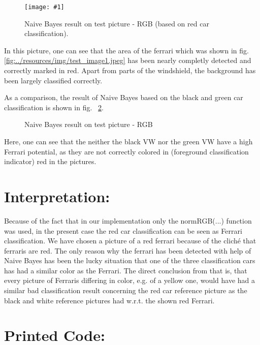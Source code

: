 \documentclass[a4paper,headings=small]{scrartcl}
\numberwithin{equation}{section} %
\numberwithin{figure}{section}   %
\newcommand{\image}[3]{
	\begin{figure}[htbp]
		\centering
		\texttt{[image: \#1]}
		\caption{#3}
		\label{fig:#1}
	\end{figure}
}
\newcommand{\generatedImgRoot}{../resources/img}
\newcommand{\generatedImgRootTwo}{../../../target}
\begin{document}
\image{\generatedImgRootTwo/1rot_result_ml.png}{0.8}{%
		Naive Bayes result on test picture - RGB (based on red car classification).}

In this picture, one can see that the area of the ferrari
which was shown in fig. \ref{fig:\generatedImgRoot/test_image1.jpeg}
has been nearly completly detected and correctly marked in red.
Apart from parts of the windshield, the background has been largely classified correctly.

As a comparison, the result of Naive Bayes based on the black and green car classification
is shown in fig. ~\ref{fig:label4}.

\begin{figure}
 \hfill
{}
\caption{Naive Bayes result on test picture - RGB}
\label{fig:label4}
\end{figure}

Here, one can see that the neither the black VW nor the green VW have a high Ferrari potential,
as they are not correctly colored in (foreground classification indicator) red in the pictures.

\section{Interpretation:}

Because of the fact that in our implementation only the normRGB(...) function was used,
in the present case the red car classification can be seen as Ferrari classification.
We have chosen a picture of a red ferrari because of the cliché that ferraris are red.
The only reason why the ferrari has been detected with help of Naive Bayes
has been the lucky situation that one of the three classification cars has had
a similar color as the Ferrari.
The direct conclusion from that is, that every picture of Ferraris differing in color, e.g. of a yellow one, would have had a similar bad
classification result concerning the red car reference picture as the black and white reference pictures had w.r.t. the shown red Ferrari.

\newpage
\section{Printed Code:}


\end{document}
